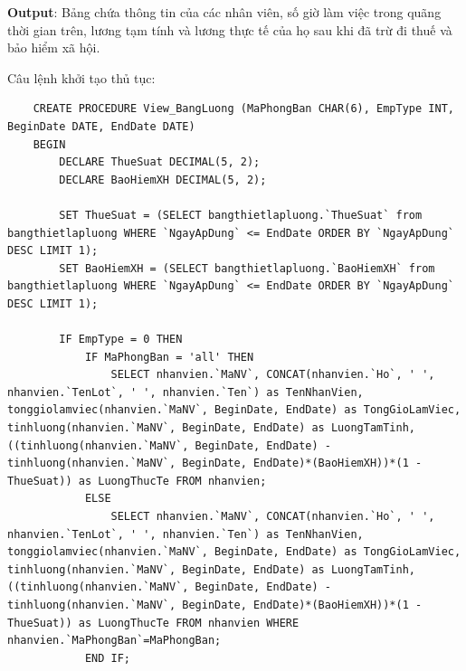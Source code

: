 \textbf{Output}: Bảng chứa thông tin của các nhân viên, số giờ làm việc trong quãng thời gian trên, lương tạm tính và lương thực tế của họ sau khi đã trừ đi thuế và bảo hiểm xã hội.

Câu lệnh khởi tạo thủ tục:
\begin{verbatim}
    CREATE PROCEDURE View_BangLuong (MaPhongBan CHAR(6), EmpType INT, BeginDate DATE, EndDate DATE) 
    BEGIN
        DECLARE ThueSuat DECIMAL(5, 2);
        DECLARE BaoHiemXH DECIMAL(5, 2);
        
        SET ThueSuat = (SELECT bangthietlapluong.`ThueSuat` from bangthietlapluong WHERE `NgayApDung` <= EndDate ORDER BY `NgayApDung` DESC LIMIT 1);
        SET BaoHiemXH = (SELECT bangthietlapluong.`BaoHiemXH` from bangthietlapluong WHERE `NgayApDung` <= EndDate ORDER BY `NgayApDung` DESC LIMIT 1);
        
        IF EmpType = 0 THEN
            IF MaPhongBan = 'all' THEN 
                SELECT nhanvien.`MaNV`, CONCAT(nhanvien.`Ho`, ' ', nhanvien.`TenLot`, ' ', nhanvien.`Ten`) as TenNhanVien, tonggiolamviec(nhanvien.`MaNV`, BeginDate, EndDate) as TongGioLamViec, tinhluong(nhanvien.`MaNV`, BeginDate, EndDate) as LuongTamTinh, ((tinhluong(nhanvien.`MaNV`, BeginDate, EndDate) - tinhluong(nhanvien.`MaNV`, BeginDate, EndDate)*(BaoHiemXH))*(1 - ThueSuat)) as LuongThucTe FROM nhanvien;
            ELSE 
                SELECT nhanvien.`MaNV`, CONCAT(nhanvien.`Ho`, ' ', nhanvien.`TenLot`, ' ', nhanvien.`Ten`) as TenNhanVien, tonggiolamviec(nhanvien.`MaNV`, BeginDate, EndDate) as TongGioLamViec, tinhluong(nhanvien.`MaNV`, BeginDate, EndDate) as LuongTamTinh, ((tinhluong(nhanvien.`MaNV`, BeginDate, EndDate) - tinhluong(nhanvien.`MaNV`, BeginDate, EndDate)*(BaoHiemXH))*(1 - ThueSuat)) as LuongThucTe FROM nhanvien WHERE nhanvien.`MaPhongBan`=MaPhongBan;
            END IF;
\end{verbatim}
